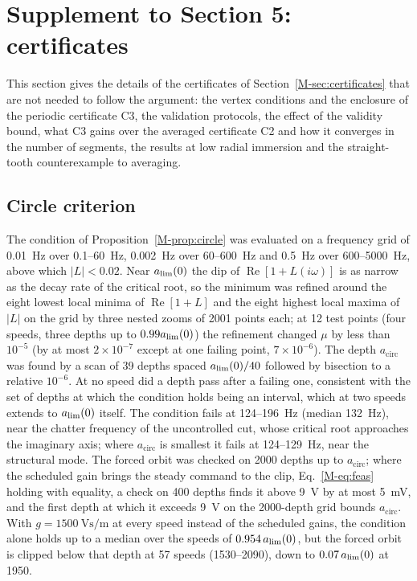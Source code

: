 \section{Supplement to Section 5: certificates}\label{supp:cert}

This section gives the details of the certificates of Section~\ref{M-sec:certificates} that are not needed to follow the argument: the vertex conditions and the enclosure of the periodic certificate C3, the validation protocols, the effect of the validity bound, what C3 gains over the averaged certificate C2 and how it converges in the number of segments, the results at low radial immersion and the straight-tooth counterexample to averaging.

\subsection{Circle criterion}\label{supp:circle}

The condition of Proposition~\ref{M-prop:circle} was evaluated on a frequency grid of \SI{0.01}{\hertz} over 0.1--\SI{60}{\hertz}, \SI{0.002}{\hertz} over 60--\SI{600}{\hertz} and \SI{0.5}{\hertz} over 600--\SI{5000}{\hertz}, above which $\lvert L\rvert<0.02$. Near $a_{\lim}(0)$ the dip of $\operatorname{Re}[1+L(i\omega)]$ is as narrow as the decay rate of the critical root, so the minimum was refined around the eight lowest local minima of $\operatorname{Re}[1+L]$ and the eight highest local maxima of $\lvert L\rvert$ on the grid by three nested zooms of 2001 points each; at 12 test points (four speeds, three depths up to $0.99a_{\lim}(0)$) the refinement changed $\mu$ by less than $10^{-5}$ (by at most $2\times10^{-7}$ except at one failing point, $7\times10^{-6}$). The depth $a_{\mathrm{circ}}$ was found by a scan of 39 depths spaced $a_{\lim}(0)/40$ followed by bisection to a relative $10^{-6}$. At no speed did a depth pass after a failing one, consistent with the set of depths at which the condition holds being an interval, which at two speeds extends to $a_{\lim}(0)$ itself. The condition fails at 124--\SI{196}{\hertz} (median \SI{132}{\hertz}), near the chatter frequency of the uncontrolled cut, whose critical root approaches the imaginary axis; where $a_{\mathrm{circ}}$ is smallest it fails at 124--\SI{129}{\hertz}, near the structural mode. The forced orbit was checked on 2000 depths up to $a_{\mathrm{circ}}$; where the scheduled gain brings the steady command to the clip, Eq.~\eqref{M-eq:feas} holding with equality, a check on 400 depths finds it above \SI{9}{\volt} by at most \SI{5}{\milli\volt}, and the first depth at which it exceeds \SI{9}{\volt} on the 2000-depth grid bounds $a_{\mathrm{circ}}$. With $g=\SI{1500}{\volt\second\per\metre}$ at every speed instead of the scheduled gains, the condition alone holds up to a median over the speeds of $0.954\,a_{\lim}(0)$, but the forced orbit is clipped below that depth at 57 speeds (1530--\SI{2090}{\rpm}), down to $0.07\,a_{\lim}(0)$ at \SI{1950}{\rpm}.

